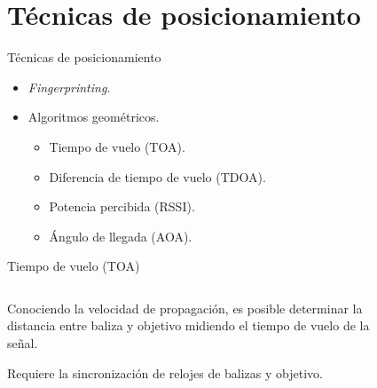 \documentclass[xcolor=table]{beamer}
\begin{document}
  \section{Técnicas de posicionamiento}

    \begin{frame}{Técnicas de posicionamiento}
    \begin{itemize}
      \item \textit{Fingerprinting}.
      \item Algoritmos geométricos.
      \begin{itemize}
        \item Tiempo de vuelo (TOA).
        \item Diferencia de tiempo de vuelo (TDOA).
        \item Potencia percibida (RSSI).
        \item Ángulo de llegada (AOA).
      \end{itemize}
    \end{itemize}
    \end{frame}



    \begin{frame}{Tiempo de vuelo (TOA)}
      \begin{columns}
        \begin{column}{0.5\textwidth}
          Conociendo la velocidad de propagación, es posible determinar la distancia entre baliza y objetivo midiendo el tiempo de vuelo de la señal.

          \vspace{.5cm}
          Requiere la sincronización de relojes de balizas y objetivo.
        \end{column}
        \begin{column}{0.5\textwidth}  
          \begin{figure}[H]
            \centering
            \def\svgwidth{\linewidth}
            
            \label{fig:TOA}
        \end{figure}
        \end{column}
      \end{columns}
    \end{frame}
\end{document}
